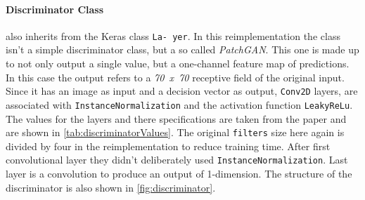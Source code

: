 \documentclass[fleqn,10pt]{SelfArx} %
\begin{document}
\paragraph{Discriminator Class} also inherits from the Keras class \texttt{La- yer}. In this reimplementation the class isn't a simple discriminator class, but a so called \textit{Patch\ac{GAN}}. This one is made up to not only output a single value, but a one-channel feature map of predictions. In this case the output refers to a \textit{70~x~70} receptive field of the original input. Since it has an image as input and a decision vector as output, \texttt{Conv2D} layers, are associated with \texttt{InstanceNormalization} and the activation function \texttt{LeakyReLu}. The values for the layers and there specifications are taken from the paper and are shown in \autoref{tab:discriminatorValues}. The original \texttt{filters} size here again is divided by four in the reimplementation to reduce training time. After first convolutional layer they didn't deliberately used \texttt{InstanceNormalization}. Last layer is a convolution to produce an output of 1-dimension. The structure of the discriminator is also shown in \autoref{fig:discriminator}. \cite{Introduction-to-Cycle-GANs}
\end{document}
